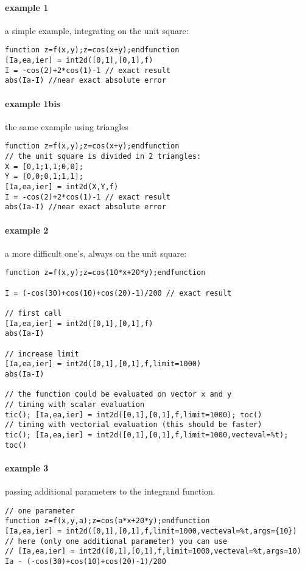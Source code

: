 \begin{examples}
  
\paragraph{example 1} a simple example, integrating on the unit square: 
\begin{Verbatim}
function z=f(x,y);z=cos(x+y);endfunction
[Ia,ea,ier] = int2d([0,1],[0,1],f) 
I = -cos(2)+2*cos(1)-1 // exact result  
abs(Ia-I) //near exact absolute error
\end{Verbatim}

\paragraph{example 1bis} the same example using triangles
\begin{Verbatim}
function z=f(x,y);z=cos(x+y);endfunction
// the unit square is divided in 2 triangles:
X = [0,1;1,1;0,0];
Y = [0,0;0,1;1,1];
[Ia,ea,ier] = int2d(X,Y,f)
I = -cos(2)+2*cos(1)-1 // exact result  
abs(Ia-I) //near exact absolute error
\end{Verbatim}
  
\paragraph{example 2} a more difficult one's, always on the unit square:
\begin{Verbatim}
function z=f(x,y);z=cos(10*x+20*y);endfunction

I = (-cos(30)+cos(10)+cos(20)-1)/200 // exact result  

// first call 
[Ia,ea,ier] = int2d([0,1],[0,1],f)
abs(Ia-I)

// increase limit
[Ia,ea,ier] = int2d([0,1],[0,1],f,limit=1000)
abs(Ia-I)

// the function could be evaluated on vector x and y
// timing with scalar evaluation
tic(); [Ia,ea,ier] = int2d([0,1],[0,1],f,limit=1000); toc()
// timing with vectorial evaluation (this should be faster)
tic(); [Ia,ea,ier] = int2d([0,1],[0,1],f,limit=1000,vecteval=%t); toc()
\end{Verbatim}
  
\paragraph{example 3} passing additional parameters to the integrand function.

\begin{Verbatim}
// one parameter
function z=f(x,y,a);z=cos(a*x+20*y);endfunction
[Ia,ea,ier] = int2d([0,1],[0,1],f,limit=1000,vecteval=%t,args={10})
// here (only one additional parameter) you can use
// [Ia,ea,ier] = int2d([0,1],[0,1],f,limit=1000,vecteval=%t,args=10)
Ia - (-cos(30)+cos(10)+cos(20)-1)/200


\end{Verbatim}
\end{examples}
